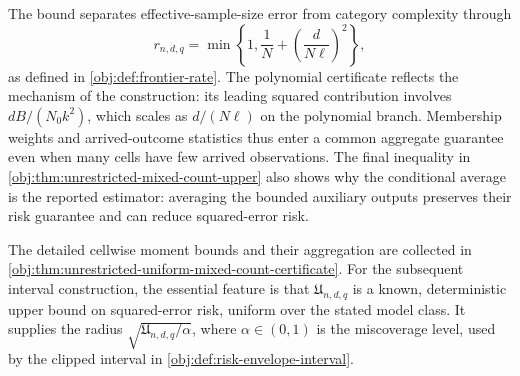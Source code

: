The bound separates effective-sample-size error from category complexity through
\[
r_{n,d,q}
=\min\left\{1,\frac1N+
\left(\frac{d}{N\ell}\right)^2\right\},
\]
as defined in \cref{obj:def:frontier-rate}. The polynomial certificate reflects the mechanism of the construction: its leading squared contribution involves \(dB/(N_0k^2)\), which scales as \(d/(N\ell)\) on the polynomial branch. Membership weights and arrived-outcome statistics thus enter a common aggregate guarantee even when many cells have few arrived observations. The final inequality in \cref{obj:thm:unrestricted-mixed-count-upper} also shows why the conditional average is the reported estimator: averaging the bounded auxiliary outputs preserves their risk guarantee and can reduce squared-error risk.

The detailed cellwise moment bounds and their aggregation are collected in \cref{obj:thm:unrestricted-uniform-mixed-count-certificate}. For the subsequent interval construction, the essential feature is that \(\mathfrak U_{n,d,q}\) is a known, deterministic upper bound on squared-error risk, uniform over the stated model class. It supplies the radius \(\sqrt{\mathfrak U_{n,d,q}/\alpha}\), where \(\alpha\in(0,1)\) is the miscoverage level, used by the clipped interval in \cref{obj:def:risk-envelope-interval}.
